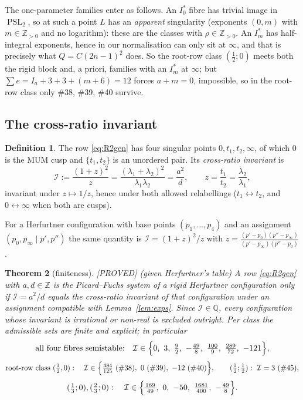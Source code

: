 \documentclass[11pt,reqno]{amsart}
\theoremstyle{plain}
\newtheorem{theorem}{Theorem}[section]
\theoremstyle{definition}
\newtheorem{definition}[theorem]{Definition}
\theoremstyle{remark}
\theoremstyle{plain}
\newcommand{\Z}{\mathbb{Z}}
\newcommand{\Q}{\mathbb{Q}}
\DeclareMathOperator{\PSL}{PSL}
\newcommand{\Proved}{\textup{\textsf{[PROVED]}}}
\begin{document}
The one-parameter families enter as follows. An $I_0^*$ fibre has trivial image
in $\PSL_2$, so at such a point $L$ has an \emph{apparent} singularity (exponents
$(0,m)$ with $m\in\Z_{>0}$ and no logarithm): these are the classes with
$\rho\in\Z_{>0}$. An $I_m^*$ has half-integral exponents, hence in our
normalisation can only sit at $\infty$, and that is precisely what $Q=C(2n-1)^2$
does. So the root-row class $(\tfrac12;0)$ meets both the rigid block and, a
priori, families with an $I_m^*$ at $\infty$; but
$\sum e=I_a+3+3+(m+6)=12$ forces $a+m=0$, impossible, so in the root-row class
only \#38, \#39, \#40 survive.

\subsection{The cross-ratio invariant}

\begin{definition}\label{def:crossinv}
The row \eqref{eq:R2gen} has four singular points $0,t_1,t_2,\infty$, of which
$0$ is the MUM cusp and $\{t_1,t_2\}$ is an unordered pair. Its
\emph{cross-ratio invariant} is
\[
\mathcal I:=\frac{(1+z)^2}{z}=\frac{(\lambda_1+\lambda_2)^2}{\lambda_1\lambda_2}
=\frac{a^2}{d},\qquad z=\frac{t_1}{t_2}=\frac{\lambda_2}{\lambda_1},
\]
invariant under $z\mapsto1/z$, hence under both allowed relabellings
($t_1\leftrightarrow t_2$, and $0\leftrightarrow\infty$ when both are cusps).
\end{definition}

For a Herfurtner configuration with base points $(p_1,\dots,p_4)$ and an
assignment $(p_0,p_\infty\mid p',p'')$ the same quantity is
$\mathcal I=(1+z)^2/z$ with
$z=\frac{(p'-p_0)(p''-p_\infty)}{(p'-p_\infty)(p''-p_0)}$.

\begin{theorem}[finiteness]\label{thm:finite}
\Proved{} \textup{(}given Herfurtner's table\textup{)} A row \eqref{eq:R2gen}
with $a,d\in\Z$ is the Picard--Fuchs system of a \emph{rigid} Herfurtner
configuration only if $\mathcal I=a^2/d$ equals the cross-ratio invariant of that
configuration under an assignment compatible with Lemma~\ref{lem:exps}. Since
$\mathcal I\in\Q$, every configuration whose invariant is irrational or non-real
is excluded outright. Per class the admissible sets are finite and explicit; in
particular
\[
\text{all four fibres semistable:}\quad
\mathcal I\in\Bigl\{0,\ 3,\ \tfrac92,\ -\tfrac{49}8,\ \tfrac{100}9,\
\tfrac{289}{72},\ -121\Bigr\},
\]
\[
\text{root-row class }(\tfrac12,0):\quad
\mathcal I\in\Bigl\{\tfrac{484}{125}\ (\#38),\ 0\ (\#39),\ -12\ (\#40)\Bigr\},
\qquad
(\tfrac12;\tfrac12):\ \mathcal I=3\ (\#45),
\]
\[
(\tfrac13;0),(\tfrac23;0):\quad
\mathcal I\in\Bigl\{\tfrac{169}{49},\ 0,\ -50,\ \tfrac{1681}{400},\
-\tfrac{49}8\Bigr\}.
\]
\end{theorem}
\end{document}
